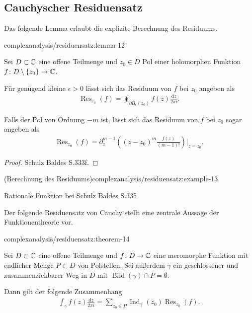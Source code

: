 \subsection{Cauchyscher Residuensatz}
\label{\detokenize{complexanalysis/residuensatz:cauchyscher-residuensatz}}
\par
Das folgende Lemma erlaubt die explizite Berechnung des Residuums.
\begin{lemma}{}{complexanalysis/residuensatz:lemma-12}



\par
Sei \(D \subset \mathbb{C}\) eine offene Teilmenge und \(z_0 \in D\) Pol einer holomorphen Funktion \(f \colon D \setminus \{z_0\} \rightarrow \mathbb{C}\).

\par
Für genügend kleine \(\epsilon > 0\) lässt sich das Residuum von \(f\) bei \(z_0\) angeben als
\begin{align*}
\operatorname{Res}_{z_0}(f) = \oint_{\partial B_\epsilon(z_0)} f(z) \frac{\mathrm{d}z}{2\pi i}.
\end{align*}
\par
Falls der Pol von Ordnung \(-m\) ist, lässt sich das Residuum von \(f\) bei \(z_0\) sogar angeben als
\begin{align*}
\operatorname{Res}_{z_0}(f) = \partial_z^{m-1}\left( (z-z_0)^m \frac{f(z)}{(m-1)!}\right)|_{z=z_0}.
\end{align*}\end{lemma}

\begin{proof}
 Schulz Baldes S.333f.
\end{proof}
\begin{example}{(Berechnung des Residuums)}{complexanalysis/residuensatz:example-13}



\par
Rationale Funktion bei Schulz Baldes S.335
\end{example}

\par
Der folgende Residuensatz von Cauchy stellt eine zentrale Aussage der Funktionentheorie vor.
\begin{theorem}{}{complexanalysis/residuensatz:theorem-14}



\par
Sei \(D \subset \mathbb{C}\) eine offene Teilmenge und \(f \colon D \rightarrow \mathbb{C}\) eine meromorphe Funktion mit endlicher Menge \(P \subset D\) von Polstellen.
Sei außerdem \(\gamma\) ein geschlossener und zusammenziehbarer Weg in \(D\) mit \(\operatorname{Bild}(\gamma) \cap P = \emptyset\).

\par
Dann gilt der folgende Zusammenhang
\begin{align*}
\int_\gamma f(z) \frac{\mathrm{d}z}{2\pi i} = \sum_{z_0 \in P} \operatorname{Ind}_\gamma(z_0) \operatorname{Res}_{z_0}(f).
\end{align*}\end{theorem}

